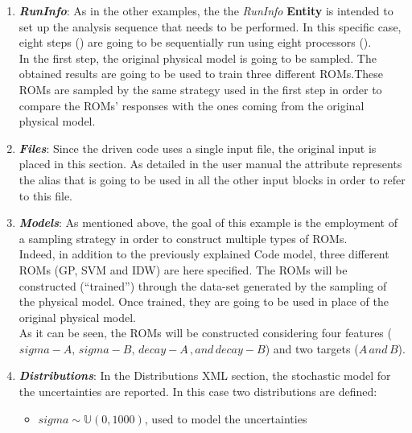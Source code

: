 \begin{enumerate}
   \item \textbf{\textit{RunInfo}}:
   As in the other examples, the the \textit{RunInfo} \textbf{Entity} is intended  to set up the analysis sequence that
   needs to be performed. In this specific case, eight steps  () are going to be sequentially run
   using eight processors ().
   \\In the first step, the original physical model is going to be sampled. The obtained results are going to be used to
   train three different ROMs.These ROMs are sampled by the same strategy used in the first step in order to compare the
   ROMs' responses with the ones coming from the original physical model.
   \item \textbf{\textit{Files}}:
   Since the driven code uses a single input file, the original input is placed in this section. As detailed in the user manual
   the attribute   represents the alias that is going to be
   used in all the other input blocks in order to refer to this file.
   \item \textbf{\textit{Models}}:
 As mentioned above, the goal of this example is the employment of
 a sampling strategy in order to construct multiple types of ROMs.
 \\Indeed, in addition to the previously explained Code
 model,
 three different ROMs (GP, SVM and IDW) are here specified. The ROMs will be
 constructed (``trained'') through the data-set generated by the sampling of the physical model. Once trained, they are going
 to be used in place of the original physical model.
 \\As it can be seen,
 the ROMs will be constructed considering four features ($sigma-A,\,sigma-B,\, decay-A \,,and \, decay-B$) and two targets
 ($A \, and \, B$).
   \item \textbf{\textit{Distributions}}:
  In the Distributions XML section, the stochastic model for the
  uncertainties are reported. In
  this case two distributions are defined:
  \begin{itemize}
    \item $sigma \sim \mathbb{U}(0,1000)$, used to model the uncertainties

\end{itemize}
\end{enumerate}

